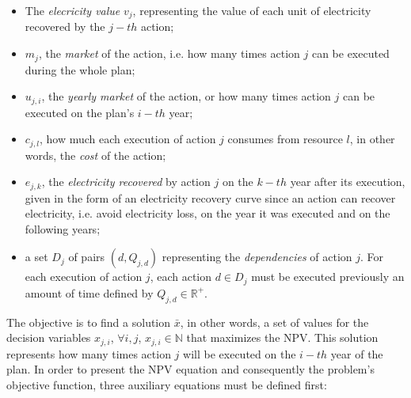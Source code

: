 \begin{itemize}
  \item The \textit{elecricity value} $v_j$, representing the value of each unit of electricity recovered by the $j-th$ action;
  \item $m_j$, the \textit{market} of the action, i.e. how many times action $j$ can be executed during the whole plan;
  \item $u_{j,i}$, the \textit{yearly market} of the action, or how many times action $j$ can be executed on the plan's $i-th$ year;
  \item $c_{j,l}$, how much each execution of action $j$ consumes from resource $l$, in other words, the \textit{cost} of the action;
  \item $e_{j,k}$, the \textit{electricity recovered} by action $j$ on the $k-th$ year after its execution, given in the form of an electricity recovery curve
		   since an action can recover electricity, i.e. avoid electricity loss, on the year it was executed and on the following years;
  \item a set $D_j$ of pairs $(d, Q_{j,d})$ representing the \textit{dependencies} of action $j$.
    For each execution of action $j$, each action $d \in D_j$ must be executed previously an amount of time defined 
    by $Q_{j,d} \in \mathbb{R^+}$.
\end{itemize}

The objective is to find a solution $\bar{x}$, in other words, a set of values for the decision variables
$x_{j,i}$, $\forall i,j$, $x_{j,i} \in \mathbb{N}$ that maximizes the NPV. This solution represents how many times action $j$ 
will be executed on the $i-th$ year of the plan. In order to present the NPV equation and consequently the problem's objective function, 
three auxiliary equations must be defined first:

